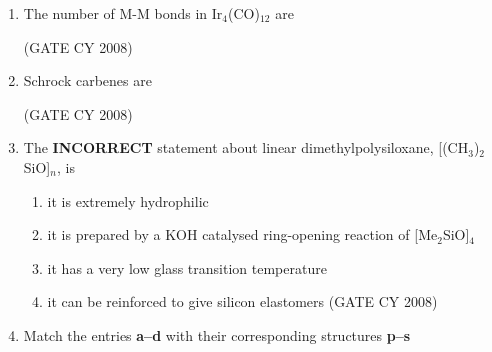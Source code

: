 \documentclass[12pt]{article}
\begin{document}
\begin{enumerate}
\item The number of M-M bonds in Ir$_4$(CO)$_{12}$ are
\begin{enumerate}
   \hfill{(GATE CY 2008)}
\end{enumerate}

\item Schrock carbenes are
\begin{enumerate}
\hfill{(GATE CY 2008)}
\end{enumerate}


\item The \textbf{INCORRECT} statement about linear dimethylpolysiloxane, [(CH$_3$)$_2$SiO]$_n$, is
\begin{enumerate}
\item it is extremely hydrophilic
\item it is prepared by a KOH catalysed ring-opening reaction of [Me$_2$SiO]$_4$
\item it has a very low glass transition temperature
\item it can be reinforced to give silicon elastomers    \hfill{(GATE CY 2008)}

\end{enumerate}




\item Match the entries \textbf{a–d} with their corresponding structures \textbf{p–s}


\end{enumerate}
\end{document}
